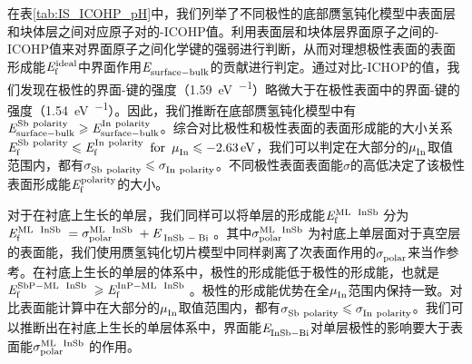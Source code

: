 在表\ref{tab:IS_ICOHP_pH}中，我们列举了不同极性的底部赝氢钝化模型中表面层和块体层之间对应原子对的-ICOHP值。利用表面层和块体层界面原子之间的-ICOHP值来对界面原子之间化学键的强弱进行判断，从而对理想极性表面的表面形成能$\it E_{\rm f}^{\rm ideal} \it$中界面作用$\it E_{\rm surface-bulk}^{\rm } \it$的贡献进行判定。通过对比-ICHOP的值，我们发现在极性的界面-键的强度（\SI{1.59}{\electronvolt\per\pair}）略微大于在极性表面中的界面-键的强度（\SI{1.54}{\electronvolt\per\pair}）。因此，我们推断在底部赝氢钝化模型中有$\energyVar{surface-bulk}{Sb\ polarity}\geqslant\energyVar{surface-bulk}{In\ polarity}$。综合对比极性和极性表面的表面形成能的大小关系$\it E_{\rm f}^{\rm Sb\ polarity} \it \leqslant \it E_{\rm f}^{\rm In\ polarity} \it\enspace \rm{for} \enspace \it \mu_{\rm In}^{\rm } \it \leqslant \SI{-2.63}{\electronvolt}$，我们可以判定在大部分的$\it \mu_{\rm In}^{\rm } \it$取值范围内，都有$\sigmaVar{Sb\ polarity}{} \leqslant \sigmaVar{In\ polarity}{}$。不同极性表面表面能$\sigma$的高低决定了该极性表面形成能$\it E_{\rm f}^{\rm polarity} \it$的大小。

对于在衬底上生长的单层，我们同样可以将单层的形成能$\energyVar{f}{ML\ \cemb{InSb}}$分为$\energyVar{f}{ML\ \cemb{InSb}}=\sigmaVar{polar}{ML\ \cemb{InSb}}+\energyVar{\cemb{InSb}-\cemb{Bi}}{}$。其中$\sigmaVar{polar}{ML\ \cemb{InSb}}$为衬底上单层面对于真空层的表面能，我们使用赝氢钝化切片模型中同样剥离了次表面作用的$\it \sigma_{\rm polar}^{\rm } \it$来当作参考。在衬底上生长的单层的体系中，极性的形成能低于极性的形成能，也就是$\energyVar{f}{SbP-ML\ \cemb{InSb}} \geqslant \energyVar{f}{InP-ML\ \cemb{InSb}}$。极性的形成能优势在全$\it \mu_{\rm In}^{\rm } \it$范围内保持一致。对比表面能计算中在大部分的$\it \mu_{\rm In}^{\rm } \it$取值范围内，都有$\sigmaVar{Sb\ polarity}{} \leqslant \sigmaVar{In\ polarity}{}$。我们可以推断出在衬底上生长的单层体系中，界面能$\it E_{\rm InSb-Bi}^{\rm } \it$对单层极性的影响要大于表面能$\sigmaVar{polar}{ML\ \cemb{InSb}}$的作用。

